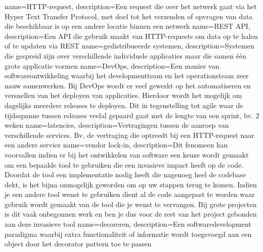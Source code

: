 	{
		name={HTTP-request},
		description={Een request die over het netwerk gaat via het Hyper Text Transfer Protocol, met doel tot het verzenden of opvragen van data die beschikbaar is op een andere locatie binnen een netwerk}
	}
	{
		name={REST API},
		description={Een API die gebruik maakt van HTTP-requests om data op te halen of te updaten via REST}
	}
	{
		name={gedistribueerde systemen},
		description={Systemen die gespreid zijn over verschillende individuele applicaties maar die samen één grote applicatie vormen}
	}
{
	name={DevOps},
	description={Een manier van softwareontwikkeling waarbij het developmentteam en het operationsteam zeer nauw samenwerken. Bij DevOps wordt er veel gewerkt op het automatiseren en versnellen van het deployen van applicaties. Hierdoor wordt het mogelijk om dagelijks meerdere releases te deployen. Dit in tegenstelling tot agile waar de tijdsspanne tussen releases veelal gepaard gaat met de lengte van een sprint, bv. 2 weken}
}
{
	name={latencies},
	description={Vertragingen tussen de aanroep van verschillende services. Bv. de vertraging die optreedt bij een HTTP-request naar een andere service}
}
{
	name={vendor lock-in},
	description={Dit fenomeen kan voorvallen indien er bij het ontwikkelen van software een keuze wordt gemaakt om een bepaalde tool te gebruiken die een invasieve impact heeft op de code. Doordat de tool een implementatie nodig heeft die nagenoeg heel de codebase dekt, is het bijna onmogelijk geworden om op uw stappen terug te komen. Indien je een andere tool wenst te gebruiken dient al de code aangepast te worden waar gebruik wordt gemaakt van de tool die je wenst te vervangen. Bij grote projecten is dit vaak onbegonnen werk en ben je dus voor de rest van het project gebonden aan deze invasieve tool}
}
{
	name={decoreren},
	description={Een softwaredevelopment paradigma waarbij extra functionaliteit of informatie wordt toegevoegd aan een object door het decorator pattern toe te passen}
}

